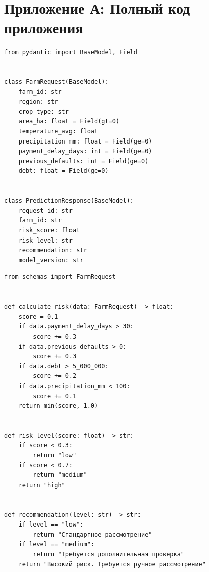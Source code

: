 \documentclass[12pt,a4paper]{article}
\begin{document}
\section*{Приложение А: Полный код приложения}

\begin{lstlisting}[caption={schemas.py}]
from pydantic import BaseModel, Field


class FarmRequest(BaseModel):
    farm_id: str
    region: str
    crop_type: str
    area_ha: float = Field(gt=0)
    temperature_avg: float
    precipitation_mm: float = Field(ge=0)
    payment_delay_days: int = Field(ge=0)
    previous_defaults: int = Field(ge=0)
    debt: float = Field(ge=0)


class PredictionResponse(BaseModel):
    request_id: str
    farm_id: str
    risk_score: float
    risk_level: str
    recommendation: str
    model_version: str
\end{lstlisting}

\begin{lstlisting}[caption={model.py}]
from schemas import FarmRequest


def calculate_risk(data: FarmRequest) -> float:
    score = 0.1
    if data.payment_delay_days > 30:
        score += 0.3
    if data.previous_defaults > 0:
        score += 0.3
    if data.debt > 5_000_000:
        score += 0.2
    if data.precipitation_mm < 100:
        score += 0.1
    return min(score, 1.0)


def risk_level(score: float) -> str:
    if score < 0.3:
        return "low"
    if score < 0.7:
        return "medium"
    return "high"


def recommendation(level: str) -> str:
    if level == "low":
        return "Стандартное рассмотрение"
    if level == "medium":
        return "Требуется дополнительная проверка"
    return "Высокий риск. Требуется ручное рассмотрение"
\end{lstlisting}
\end{document}
